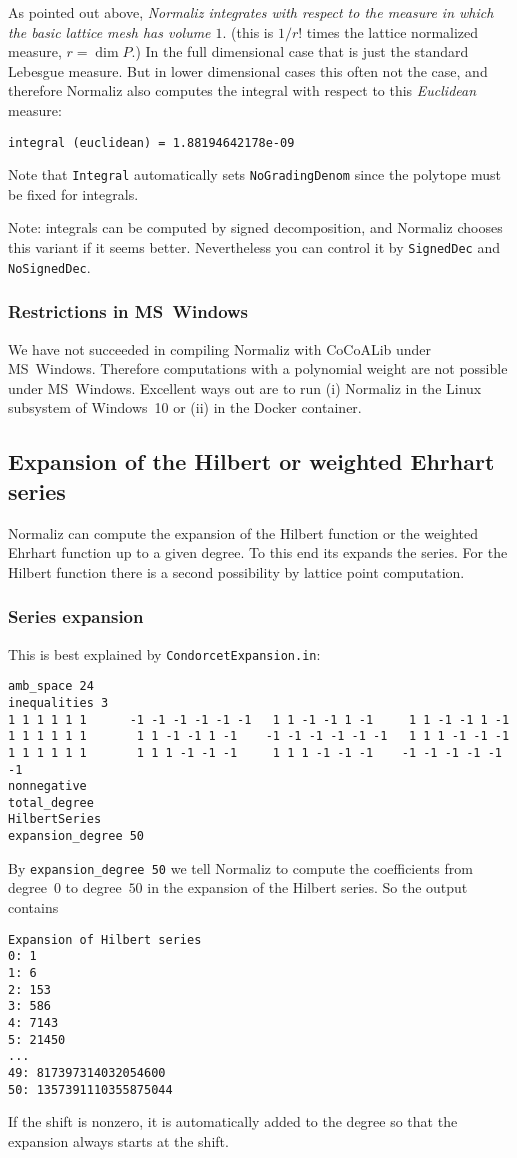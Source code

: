 \documentclass[12pt,a4paper]{scrartcl}
\theoremstyle{definition}
\def\ttt{\texttt}
\begin{document}
As pointed out above, \emph{Normaliz integrates with respect to the measure in which the basic lattice mesh has volume $1$}. (this is $1/r!$ times the lattice normalized measure, $r=\dim P$.) In the full dimensional case that is just the standard Lebesgue measure. But in lower dimensional cases this often not the case, and therefore Normaliz also computes the integral with respect to this \emph{Euclidean} measure:
\begin{Verbatim}
integral (euclidean) = 1.88194642178e-09
\end{Verbatim}

Note that \verb|Integral| automatically sets \verb|NoGradingDenom| since the polytope must be fixed for integrals.

Note: integrals can be computed by signed decomposition, and Normaliz chooses this variant if it seems better. Nevertheless you can control it by \ttt{SignedDec} and \ttt{NoSignedDec}.

\subsubsection{Restrictions in MS~Windows}

We have not succeeded in compiling Normaliz with CoCoALib under MS~Windows. Therefore computations with a polynomial weight are not possible under MS~Windows.
Excellent ways out are to run (i) Normaliz in the Linux subsystem of Windows~10 or (ii) in the Docker container.

\subsection{Expansion of the Hilbert or weighted Ehrhart series}\label{expansion}

Normaliz can compute the expansion of the Hilbert function or the weighted Ehrhart function up to a given degree. To this end its expands the series. For the Hilbert function there is a second possibility by lattice point computation.

\subsubsection{Series expansion}
This is best explained by \verb|CondorcetExpansion.in|:
\begin{Verbatim}
amb_space 24
inequalities 3
1 1 1 1 1 1      -1 -1 -1 -1 -1 -1   1 1 -1 -1 1 -1     1 1 -1 -1 1 -1
1 1 1 1 1 1       1 1 -1 -1 1 -1    -1 -1 -1 -1 -1 -1   1 1 1 -1 -1 -1
1 1 1 1 1 1       1 1 1 -1 -1 -1     1 1 1 -1 -1 -1    -1 -1 -1 -1 -1 -1
nonnegative
total_degree
HilbertSeries
expansion_degree 50
\end{Verbatim}
By \verb|expansion_degree 50| we tell Normaliz to compute the coefficients from degree~$0$ to degree~$50$ in the expansion of the Hilbert series. So the output contains
\begin{Verbatim}
Expansion of Hilbert series
0: 1
1: 6
2: 153
3: 586
4: 7143
5: 21450
...
49: 817397314032054600
50: 1357391110355875044
\end{Verbatim}
If the shift is nonzero, it is automatically added to the degree so that the expansion always starts at the shift.
\end{document}
